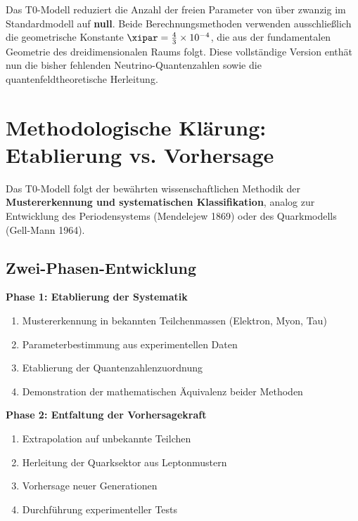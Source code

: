 \begin{important}
	Das T0-Modell reduziert die Anzahl der freien Parameter von über zwanzig im Standardmodell auf \textbf{null}. Beide Berechnungsmethoden verwenden ausschließlich die geometrische Konstante $\xipar = \frac{4}{3} \times 10^{-4}$, die aus der fundamentalen Geometrie des dreidimensionalen Raums folgt. Diese vollständige Version enthät nun die bisher fehlenden Neutrino-Quantenzahlen sowie die quantenfeldtheoretische Herleitung.
\end{important}

\section{Methodologische Klärung: Etablierung vs. Vorhersage}
\label{sec:methodological_clarification}

\begin{important}
	Das T0-Modell folgt der bewährten wissenschaftlichen Methodik der \textbf{Mustererkennung und systematischen Klassifikation}, analog zur Entwicklung des Periodensystems (Mendelejew 1869) oder des Quarkmodells (Gell-Mann 1964).
\end{important}

\subsection{Zwei-Phasen-Entwicklung}
\label{subsec:two_phases}

\textbf{Phase 1: Etablierung der Systematik}
\begin{enumerate}
	\item Mustererkennung in bekannten Teilchenmassen (Elektron, Myon, Tau)
	\item Parameterbestimmung aus experimentellen Daten
	\item Etablierung der Quantenzahlenzuordnung
	\item Demonstration der mathematischen Äquivalenz beider Methoden
\end{enumerate}

\textbf{Phase 2: Entfaltung der Vorhersagekraft}
\begin{enumerate}
	\item Extrapolation auf unbekannte Teilchen
	\item Herleitung der Quarksektor aus Leptonmustern
	\item Vorhersage neuer Generationen
	\item Durchführung experimenteller Tests
\end{enumerate}

